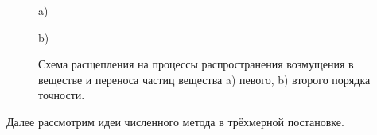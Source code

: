 \begin{figure}[h!]
\begin{minipage}{0.47\linewidth}
 a)
\end{minipage}
\begin{minipage}{0.47\linewidth}
 b)
\end{minipage}
\caption{Схема расщепления на процессы распространения возмущения в веществе и переноса частиц вещества a) певого, b) второго порядка точности.}
\label{pic:splitting}
\end{figure} 

Далее рассмотрим идеи численного метода в трёхмерной постановке.
